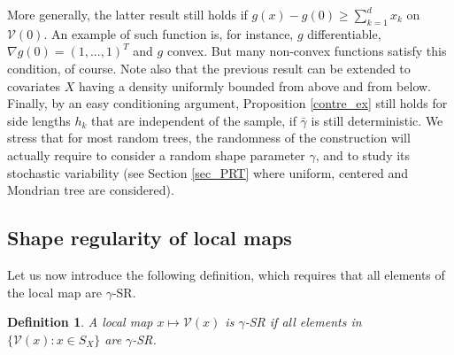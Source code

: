 \documentclass[paper=a4, fontsize=11pt]{scrartcl}
\newtheorem{definition}[theorem]{Definition}
\begin{document}

%

More generally, the latter result still holds if $g(x) - g(0) \geq \sum_{k=1}^d x_k$ on $\mathcal V (0)$. An example of such function is, for instance, $g$ differentiable, $\nabla g (0)= (1,...,1)^T$ and $g$ convex. But many non-convex functions satisfy this condition, of course. Note also that the previous result can be extended to covariates $X$ having a density uniformly bounded from above and from below. Finally, by an easy conditioning argument, Proposition \ref{contre_ex}
still holds for side lengths $h_k$ that are independent of the sample, if $\bar \gamma$ is still deterministic. We stress that for most random trees, the randomness of the construction will actually require to consider a random shape parameter $\gamma$, and to study its stochastic variability (see Section \ref{sec_PRT} where uniform, centered and Mondrian tree are considered).%

\subsection{Shape regularity of local maps}\label{4.3}

Let us now introduce the following definition, which requires that all elements of the local map are $\gamma $-SR. 

\begin{definition}
\hspace{-0.2cm} A local map $x\mapsto  \mathcal V (x)$ is $\gamma$-SR  if all elements in \hbox{$\{\mathcal V (x) : x\in S_X\}$} are $\gamma$-SR. 
\end{definition}
\end{document}

